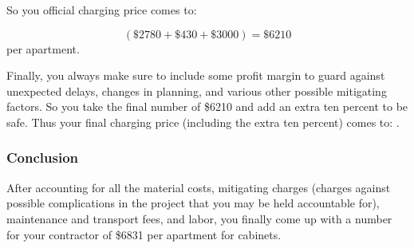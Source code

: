 \documentclass{ximeraXloud}
\begin{document}
    So you official charging price comes to:
    
    \[
        (\$2780 + \$430 + \$ 3000) = \$6210
    \]
    per apartment.
    
    Finally, you always make sure to include some profit margin to guard against unexpected delays, changes in planning, and various other possible mitigating factors. So you take the final number of \$6210 and add an extra ten percent to be safe. Thus your final charging price (including the extra ten percent) comes to: .

\subsubsection*{Conclusion}

    After accounting for all the material costs, mitigating charges (charges against possible complications in the project that you may be held accountable for), maintenance and transport fees, and labor, you finally come up with a number for your contractor of \$6831 per apartment for cabinets.
\end{document}
